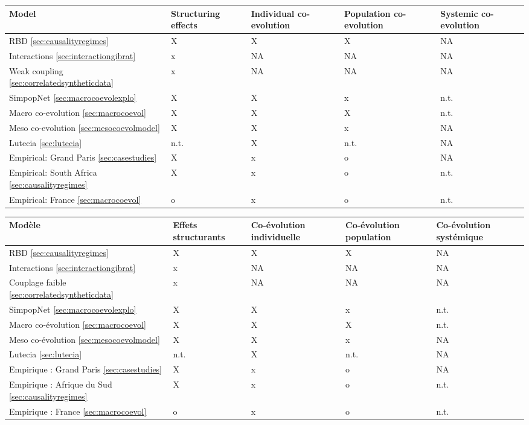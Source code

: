 \begin{table}
{\begin{tabular}[6pt]{|p{4cm}|p{2.5cm}|p{2.5cm}|p{2.5cm}|p{2.5cm}|}
\hline
Model & Structuring effects & Individual co-evolution & Population co-evolution & Systemic co-evolution \\\hline
RBD \ref{sec:causalityregimes} & X & X & X & NA \\\hline
Interactions \ref{sec:interactiongibrat} & x & NA & NA & NA \\\hline
Weak coupling \ref{sec:correlatedsyntheticdata} & x & NA & NA & NA \\\hline
SimpopNet \ref{sec:macrocoevolexplo} & X & X & x & n.t. \\\hline
Macro co-evolution \ref{sec:macrocoevol} & X & X & X & n.t. \\\hline
Meso co-evolution \ref{sec:mesocoevolmodel} & X & X & x & NA\\\hline
Lutecia \ref{sec:lutecia} & n.t. & X & n.t. & NA\\\hline
Empirical: Grand Paris \ref{sec:casestudies} & X & x & o & NA\\\hline
Empirical: South Africa \ref{sec:causalityregimes} & X & x & o & n.t.\\\hline
Empirical: France \ref{sec:macrocoevol} & o & x & o & n.t.\\\hline
\end{tabular}
}{
\begin{tabular}[6pt]{|p{4cm}|p{2.5cm}|p{2.5cm}|p{2.5cm}|p{2.5cm}|}
\hline
Modèle & Effets structurants & Co-évolution individuelle &  Co-évolution population & Co-évolution systémique \\\hline
RBD \ref{sec:causalityregimes} & X & X & X & NA \\\hline
Interactions \ref{sec:interactiongibrat} & x & NA & NA & NA \\\hline
Couplage faible \ref{sec:correlatedsyntheticdata} & x & NA & NA & NA \\\hline
SimpopNet \ref{sec:macrocoevolexplo} & X & X & x & n.t. \\\hline
Macro co-évolution \ref{sec:macrocoevol} & X & X & X & n.t. \\\hline
Meso co-évolution \ref{sec:mesocoevolmodel} & X & X & x & NA\\\hline
Lutecia \ref{sec:lutecia} & n.t. & X & n.t. & NA\\\hline
Empirique : Grand Paris \ref{sec:casestudies} & X & x & o & NA\\\hline
Empirique : Afrique du Sud \ref{sec:causalityregimes} & X & x & o & n.t.\\\hline
Empirique : France \ref{sec:macrocoevol} & o & x & o & n.t.\\\hline
\end{tabular}
}
\end{table}


